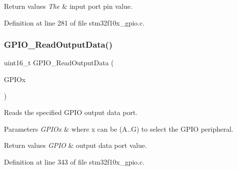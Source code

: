 \begin{DoxyRetVals}{Return values}
{\em The} & input port pin value. \\
\hline
\end{DoxyRetVals}


Definition at line 281 of file stm32f10x\+\_\+gpio.\+c.

\mbox{\label{group___g_p_i_o___exported___functions_gaf8938a34280b7dc3e39872a7c17bb323}} 
\subsubsection{\texorpdfstring{G\+P\+I\+O\+\_\+\+Read\+Output\+Data()}{GPIO\_ReadOutputData()}}
{\footnotesize\ttfamily uint16\+\_\+t G\+P\+I\+O\+\_\+\+Read\+Output\+Data (\begin{DoxyParamCaption}\item[{\hyperlink{struct_g_p_i_o___type_def}{G\+P\+I\+O\+\_\+\+Type\+Def} $\ast$}]{G\+P\+I\+Ox }\end{DoxyParamCaption})}



Reads the specified G\+P\+IO output data port. 


\begin{DoxyParams}{Parameters}
{\em G\+P\+I\+Ox} & where x can be (A..G) to select the G\+P\+IO peripheral. \\
\hline
\end{DoxyParams}

\begin{DoxyRetVals}{Return values}
{\em G\+P\+IO} & output data port value. \\
\hline
\end{DoxyRetVals}


Definition at line 343 of file stm32f10x\+\_\+gpio.\+c.

\mbox{\label{group___g_p_i_o___exported___functions_ga138270f8695b105b7c6ed405792919c1}} 

